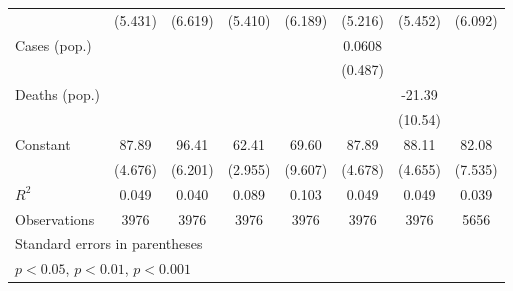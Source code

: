 \documentclass{article}
\begin{document}
{\begin{longtable}{l*{7}{c}}
                &  (5.431)         &  (6.619)         &  (5.410)         &  (6.189)         &  (5.216)         &  (5.452)         &  (6.092)         \\
Cases (pop.)    &                  &                  &                  &                  &   0.0608         &                  &                  \\
                &                  &                  &                  &                  &  (0.487)         &                  &                  \\
Deaths (pop.)   &                  &                  &                  &                  &                  &   -21.39         &                  \\
                &                  &                  &                  &                  &                  &  (10.54)         &                  \\
Constant        &    87.89\sym{***}&    96.41\sym{***}&    62.41\sym{***}&    69.60\sym{***}&    87.89\sym{***}&    88.11\sym{***}&    82.08\sym{***}\\
                &  (4.676)         &  (6.201)         &  (2.955)         &  (9.607)         &  (4.678)         &  (4.655)         &  (7.535)         \\
\hline
\(R^{2}\)       &    0.049         &    0.040         &    0.089         &    0.103         &    0.049         &    0.049         &    0.039         \\
Observations    &     3976         &     3976         &     3976         &     3976         &     3976         &     3976         &     5656         \\
\hline\hline
\multicolumn{8}{l}{\footnotesize Standard errors in parentheses}\\
\multicolumn{8}{l}{\footnotesize \sym{*} \(p<0.05\), \sym{**} \(p<0.01\), \sym{***} \(p<0.001\)}\\
\end{longtable}
}
\end{document}
